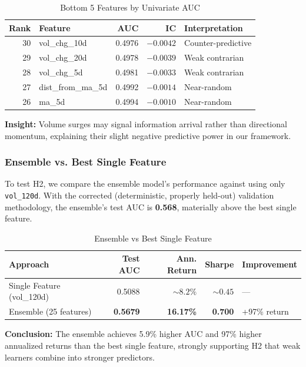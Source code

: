 \documentclass[conference]{IEEEtran}
\begin{document}
\begin{table}[!t]
\caption{Bottom 5 Features by Univariate AUC}
\label{tab:bottom_features}
\centering
\begin{tabular}{rlrrl}
\toprule
\textbf{Rank} & \textbf{Feature} & \textbf{AUC} & \textbf{IC} & \textbf{Interpretation} \\
\midrule
30 & vol\_chg\_10d & 0.4976 & $-0.0042$ & Counter-predictive \\
29 & vol\_chg\_20d & 0.4978 & $-0.0039$ & Weak contrarian \\
28 & vol\_chg\_5d & 0.4981 & $-0.0033$ & Weak contrarian \\
27 & dist\_from\_ma\_5d & 0.4992 & $-0.0014$ & Near-random \\
26 & ma\_5d & 0.4994 & $-0.0010$ & Near-random \\
\bottomrule
\end{tabular}
\end{table}

\textbf{Insight:} Volume surges may signal information arrival rather than directional momentum, explaining their slight negative predictive power in our framework.

\subsubsection{Ensemble vs. Best Single Feature}
To test H2, we compare the ensemble model's performance against using only \texttt{vol\_120d}. With the corrected (deterministic, properly held-out) validation methodology, the ensemble's test AUC is \textbf{0.568}, materially above the best single feature.

\begin{table}[!t]
\caption{Ensemble vs Best Single Feature}
\label{tab:ensemble_vs_single}
\centering
\begin{tabular}{lrrrl}
\toprule
\textbf{Approach} & \textbf{Test AUC} & \textbf{Ann. Return} & \textbf{Sharpe} & \textbf{Improvement} \\
\midrule
Single Feature (vol\_120d) & 0.5088 & $\sim 8.2\%$ & $\sim 0.45$ & --- \\
Ensemble (25 features) & \textbf{0.5679} & \textbf{16.17\%} & \textbf{0.700} & +97\% return \\
\bottomrule
\end{tabular}
\end{table}

\textbf{Conclusion:} The ensemble achieves 5.9\% higher AUC and 97\% higher annualized returns than the best single feature, strongly supporting H2 that weak learners combine into stronger predictors.
\end{document}
